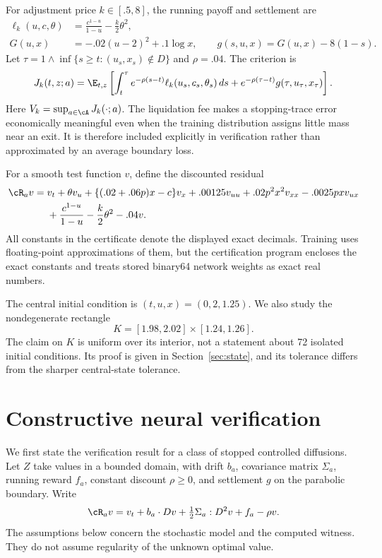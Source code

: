 For adjustment price $k\in[.5,8]$, the running payoff and settlement are
\begin{align}
 \ell_k(u,c,\theta)&=\frac{c^{1-u}}{1-u}-\frac{k}{2}\theta^2,\label{eq:ell}\\
 G(u,x)&=-.02(u-2)^2+.1\log x,\qquad
 g(s,u,x)=G(u,x)-8(1-s).\label{eq:trace}
\end{align}
Let $\tau=1\wedge\inf\{s\geq t:(u_s,x_s)\notin D\}$ and $\rho=.04$. The criterion is
\begin{equation}
 J_k(t,z;a)=\E_{t,z}\left[\int_t^\tau e^{-\rho(s-t)}\ell_k(u_s,c_s,\theta_s)\,ds
       +e^{-\rho(\tau-t)}g(\tau,u_\tau,x_\tau)\right].
 \label{eq:value}
\end{equation}
Here $V_k=\sup_{a\in\cA}J_k(\cdot;a)$. The liquidation fee makes a stopping-trace error economically meaningful even when the training distribution assigns little mass near an exit. It is therefore included explicitly in verification rather than approximated by an average boundary loss.

For a smooth test function $v$, define the discounted residual
\begin{align}
 \cR_a v={}&v_t+\theta v_u+\{(.02+.06p)x-c\}v_x
       +.00125v_{uu}+.02p^2x^2v_{xx}-.0025pxv_{ux}\notag\\
       &+\frac{c^{1-u}}{1-u}-\frac{k}{2}\theta^2-.04v.
 \label{eq:residual}
\end{align}
All constants in the certificate denote the displayed exact decimals. Training uses floating-point approximations of them, but the certification program encloses the exact constants and treats stored binary64 network weights as exact real numbers.

The central initial condition is $(t,u,x)=(0,2,1.25)$. We also study the nondegenerate rectangle
\begin{equation}
 K=[1.98,2.02]\times[1.24,1.26].\label{eq:K}
\end{equation}
The claim on $K$ is uniform over its interior, not a statement about 72 isolated initial conditions. Its proof is given in Section~\ref{sec:state}, and its tolerance differs from the sharper central-state tolerance.

\section{Constructive neural verification}\label{sec:verification}
We first state the verification result for a class of stopped controlled diffusions. Let $Z$ take values in a bounded domain, with drift $b_a$, covariance matrix $\Sigma_a$, running reward $f_a$, constant discount $\rho\geq0$, and settlement $g$ on the parabolic boundary. Write
\[
 \cR_a v=v_t+b_a\cdot Dv+\tfrac12\Sigma_a:D^2v+f_a-\rho v.
\]
The assumptions below concern the stochastic model and the computed witness. They do not assume regularity of the unknown optimal value.

